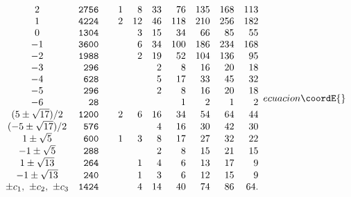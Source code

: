 \documentclass[a4paper,12pt]{article}
\begin{document}
\begin{equation}
{\begin{array}{crrrrrrrrr}
2       &       {\tt    2756    }       &               &       1
&       8       &       33      &       76      &       135     &
168     &       113     \\
1       &       {\tt    4224    }       &               &       2
&       12      &       46      &       118     &       210     &
256     &       182     \\
0       &       {\tt1304        }       &               &
&       3       &       15      &       34      &       66      &
85      &       55      \\
-1      &       {\tt    3600    }       &               &
&       6       &       34      &       100     &       186     &
234     &       168     \\
-2      &       {\tt    1988    }       &               &
&       2       &       19      &       52      &       104     &
136     &       95      \\
-3      &       {\tt    296     }       &               &
&               &       2       &       8       &       16      &
20      &       18      \\
-4      &       {\tt    628     }       &               &
&               &       5       &       17      &       33      &
45      &       32      \\
-5      &       {\tt    296     }       &               &
&               &       2       &       8       &       16      &
20      &       18      \\
-6      &       {\tt    28      }       &               &               &
&               &       1       &       2       &       1       &       2
\\
 (5\pm\sqrt{17})/2      &       {\tt    1200    }       &               &
 2       &       6       &       16      &       34      &       54      &
 64      &       44      \\
 (-5\pm\sqrt{17})/2     &       {\tt    576     }       &               &
 &               &       4       &       16      &       30      &       42
 &       30      \\
 1\pm\sqrt{5}   &       {\tt    600     }       &               &       1
 &       3       &       8       &       17      &       27      &       32
 &       22      \\
 -1\pm\sqrt{5}  &       {\tt    288     }       &               &
 &               &       2       &       8       &       15      &       21
 &       15      \\
 1\pm\sqrt{13}  &       {\tt    264     }       &               &
 &       1       &       4       &       6       &       13      &       17
 &       9       \\
-1 \pm\sqrt{13} &       {\tt    240     }       &               &
&       1       &       3       &       6       &       12      &       15
&       9       \\
 \pm c_1,\ \pm c_2,\ \pm c_3    &       {\tt    1424    }       &
 &               &       4       &       14      &       40      &       74
 &       86      &       64.
\end{array}
}{ecuacion}\coordE{}\end{equation}
\end{document}
